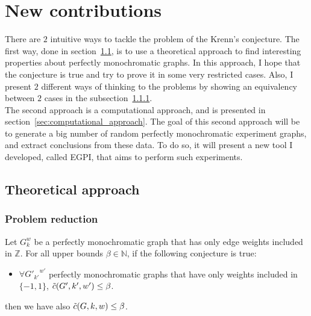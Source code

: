 \chapter{New contributions}
\label{ch:new-contributions}

There are $2$ intuitive ways to tackle the problem of the Krenn's conjecture.
The first way, done in section~\ref{sec:theoretical_approach}, is to use a theoretical approach to find interesting properties about perfectly monochromatic graphs.
In this approach, I hope that the conjecture is true and try to prove it in some very restricted cases.
Also, I present $2$ different ways of thinking to the problems by showing an equivalency between $2$ cases in the subsection~\ref{subsec:problem_reduction}.\\

The second approach is a computational approach, and is presented in section~\ref{sec:computational_approach}.
The goal of this second approach will be to generate a big number of random perfectly monochromatic experiment graphs, and extract conclusions from these data.
To do so, it will present a new tool I developed, called EGPI, that aims to perform such experiments.


\section{Theoretical approach}
\label{sec:theoretical_approach}

\subsection{Problem reduction}
\label{subsec:problem_reduction}

\begin{lemma}
    Let $G_k^w$ be a perfectly monochromatic graph that has only edge weights included in $\mathbb{Z}$.
    For all upper bounds $\beta \in \mathbb{N}$, if the following conjecture is true:
    \begin{itemize}
        \item $\forall {G'_{k'}}^{w'}$ perfectly monochromatic graphs that have only weights included in $\{-1, 1\}$, $\Tilde{c}(G', k', w') \leq \beta$.
    \end{itemize}
    then we have also $\Tilde{c}(G, k, w) \leq \beta$.
\end{lemma}


